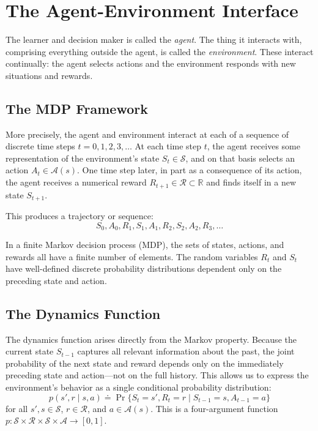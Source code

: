 \documentclass[12pt]{article}
\begin{document}
\section{The Agent-Environment Interface}

The learner and decision maker is called the \textit{agent}. The thing it interacts with, comprising everything outside the agent, is called the \textit{environment}. These interact continually: the agent selects actions and the environment responds with new situations and rewards.

\subsection{The MDP Framework}

More precisely, the agent and environment interact at each of a sequence of discrete time steps $t = 0, 1, 2, 3, \ldots$ At each time step $t$, the agent receives some representation of the environment's state $S_t \in \mathcal{S}$, and on that basis selects an action $A_t \in \mathcal{A}(s)$. One time step later, in part as a consequence of its action, the agent receives a numerical reward $R_{t+1} \in \mathcal{R} \subset \mathbb{R}$ and finds itself in a new state $S_{t+1}$.

This produces a trajectory or sequence:
\begin{equation}
S_0, A_0, R_1, S_1, A_1, R_2, S_2, A_2, R_3, \ldots
\end{equation}

In a finite Markov decision process (MDP), the sets of states, actions, and rewards all have a finite number of elements. The random variables $R_t$ and $S_t$ have well-defined discrete probability distributions dependent only on the preceding state and action.

\subsection{The Dynamics Function}

The dynamics function arises directly from the Markov property. Because the current state $S_{t-1}$ captures all relevant information about the past, the joint probability of the next state and reward depends only on the immediately preceding state and action---not on the full history. This allows us to express the environment's behavior as a single conditional probability distribution:
\begin{equation}
p(s', r \mid s, a) \doteq \Pr\{S_t = s', R_t = r \mid S_{t-1} = s, A_{t-1} = a\}
\end{equation}
for all $s', s \in \mathcal{S}$, $r \in \mathcal{R}$, and $a \in \mathcal{A}(s)$. This is a four-argument function $p: \mathcal{S} \times \mathcal{R} \times \mathcal{S} \times \mathcal{A} \to [0, 1]$.
\end{document}
